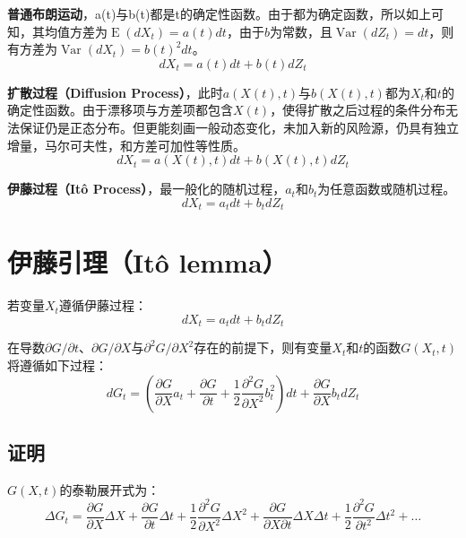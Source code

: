 \documentclass[11pt]{article}
\newcommand{\E}{\operatorname{E}}
\newcommand{\Var}{\operatorname{Var}}
\begin{document}
\textbf{普通布朗运动}，a(t)与b(t)都是t的确定性函数。由于都为确定函数，所以如上可知，其均值方差为$\E(dX_t) = a(t)dt$，由于$b$为常数，且$\Var(dZ_t)=dt$，则有方差为$\Var(dX_t)=b(t)^2 dt$。
\begin{equation*}
    dX_t =a(t) dt + b(t) dZ_t
\end{equation*}

\textbf{扩散过程（Diffusion Process）}，此时$a(X(t),t)$与$b(X(t),t)$都为$X_t$和$t$的确定性函数。由于漂移项与方差项都包含$X(t)$，使得扩散之后过程的条件分布无法保证仍是正态分布。但更能刻画一般动态变化，未加入新的风险源，仍具有独立增量，马尔可夫性，和方差可加性等性质。
\begin{equation*}
    dX_t =a(X(t),t) dt + b(X(t),t) dZ_t
\end{equation*}

\textbf{伊藤过程（Itô Process）}，最一般化的随机过程，$a_t$和$b_t$为任意函数或随机过程。
\begin{equation*}
    dX_t =a_t dt + b_t dZ_t
\end{equation*}

\section{伊藤引理（Itô lemma）}

若变量$X_t$遵循伊藤过程：
\begin{equation*}
    dX_t =a_t dt + b_t dZ_t
\end{equation*}

在导数$\partial G/\partial t$、$\partial G/\partial X$与$\partial^2 G/\partial X^2$存在的前提下，则有变量$X_t$和$t$的函数$G(X_t,t)$将遵循如下过程：
\begin{equation*}
    dG_t = \left(\frac{\partial G}{\partial X}a_t  + \frac{\partial G}{\partial t} + \frac{1}{2}\frac{\partial^2 G}{\partial X^2} b^2_t \right)dt + \frac{\partial G}{\partial X} b_t dZ_t
\end{equation*}

\subsection{证明}

$G(X,t)$的泰勒展开式为：
\begin{equation*}
    \Delta G_t = \frac{\partial G}{\partial X} \Delta X + \frac{\partial G}{\partial t} \Delta t + \frac{1}{2} \frac{\partial^2 G}{\partial X^2}\Delta X^2  + \frac{\partial G}{\partial X \partial t}\Delta X \Delta t + \frac{1}{2} \frac{\partial^2 G}{\partial t^2} \Delta t^2 + \dots
\end{equation*}
\end{document}
